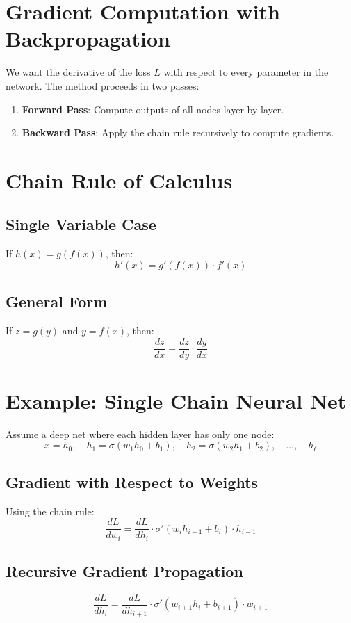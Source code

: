 \documentclass[11pt]{article}
\begin{document}
\section{Gradient Computation with Backpropagation}

We want the derivative of the loss $L$ with respect to every parameter in the network. The method proceeds in two passes:

\begin{enumerate}
    \item \textbf{Forward Pass}: Compute outputs of all nodes layer by layer.
    \item \textbf{Backward Pass}: Apply the chain rule recursively to compute gradients.
\end{enumerate}

\section{Chain Rule of Calculus}

\subsection*{Single Variable Case}
If $h(x) = g(f(x))$, then:
\[
h'(x) = g'(f(x)) \cdot f'(x)
\]

\subsection*{General Form}
If $z = g(y)$ and $y = f(x)$, then:
\[
\frac{dz}{dx} = \frac{dz}{dy} \cdot \frac{dy}{dx}
\]

\section{Example: Single Chain Neural Net}

Assume a deep net where each hidden layer has only one node:
\[
x = h_0, \quad h_1 = \sigma(w_1 h_0 + b_1), \quad h_2 = \sigma(w_2 h_1 + b_2), \quad \ldots, \quad h_{\ell}
\]

\subsection*{Gradient with Respect to Weights}

Using the chain rule:
\[
\frac{dL}{dw_i} = \frac{dL}{dh_i} \cdot \sigma'(w_i h_{i-1} + b_i) \cdot h_{i-1}
\]

\subsection*{Recursive Gradient Propagation}
\[
\frac{dL}{dh_i} = \frac{dL}{dh_{i+1}} \cdot \sigma'(w_{i+1} h_i + b_{i+1}) \cdot w_{i+1}
\]
\end{document}
